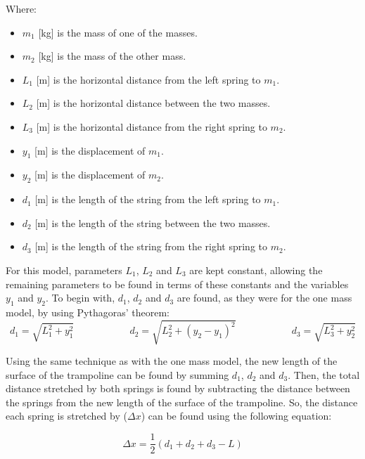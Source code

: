 \noindent Where:
\begin{itemize}
\item $m_1$ [kg] is the mass of one of the masses.
\item $m_2$ [kg] is the mass of the other mass.
\item $L_1$ [m] is the horizontal distance from the left spring to $m_1$.
\item $L_2$ [m] is the horizontal distance between the two masses.
\item $L_3$ [m] is the horizontal distance from the right spring to $m_2$.
\item $y_1$ [m] is the displacement of $m_1$.
\item $y_2$ [m] is the displacement of $m_2$.
\item $d_1$ [m] is the length of the string from the left spring to $m_1$.
\item $d_2$ [m] is the length of the string between the two masses.
\item $d_3$ [m] is the length of the string from the right spring to $m_2$.
\end{itemize}

\noindent For this model, parameters $L_1$, $L_2$ and $L_3$ are kept constant, allowing the remaining parameters to be found in terms of these constants and the variables $y_1$ and $y_2$. To begin with, $d_1$, $d_2$ and $d_3$ are found, as they were for the one mass model, by using Pythagoras' theorem:\\

\begin{equation}
d_1 = \sqrt{L_{1}^{2} + y_{1}^{2}} \,\,\,\,\,\,\,\,\,\,\,\,\,\,\,\,\,\,\,\,\,\,\,\,\,\,\,\,\,\,\,\,\,\,d_2 = \sqrt{L_{2}^{2} + (y_{2}-y_{1})^{2}} \,\,\,\,\,\,\,\,\,\,\,\,\,\,\,\,\,\,\,\,\,\,\,\,\,\,\,\,\,\,\,\,\,\,d_3 = \sqrt{L_{3}^{2} + y_{2}^{2}}
\end{equation}

\noindent Using the same technique as with the one mass model, the new length of the surface of the trampoline can be found by summing $d_1$, $d_2$ and $d_3$. Then, the total distance stretched by both springs is found by subtracting the distance between the springs from the new length of the surface of the trampoline. So, the distance each spring is stretched by ($\Delta x$) can be found using the following equation:

\begin{equation}
\Delta x = \frac{1}{2}\left(d_{1}+d_{2}+d_{3}-L\right)
\end{equation}

